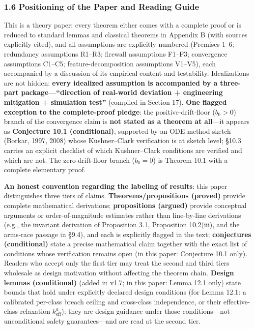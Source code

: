 \documentclass[
  11pt]{article}
\begin{document}
\subsubsection{1.6 Positioning of the Paper and Reading
Guide}\label{positioning-of-the-paper-and-reading-guide}

This is a theory paper: every theorem either comes with a complete proof
or is reduced to standard lemmas and classical theorems in Appendix B
(with sources explicitly cited), and all assumptions are explicitly
numbered (Premises 1--6; redundancy assumptions R1--R3; firewall
assumptions F1--F3; convergence assumptions C1--C5;
feature-decomposition assumptions V1--V5), each accompanied by a
discussion of its empirical content and testability. Idealizations are
not hidden: \textbf{every idealized assumption is accompanied by a
three-part package---``direction of real-world deviation + engineering
mitigation + simulation test''} (compiled in Section 17). \textbf{One
flagged exception to the complete-proof pledge}: the
positive-drift-floor (\(b_0>0\)) branch of the convergence claim is
\textbf{not stated as a theorem at all}---it appears as
\textbf{Conjecture 10.1 (conditional)}, supported by an ODE-method
sketch (Borkar, 1997, 2008) whose Kushner--Clark verification is at
sketch level; §10.3 carries an explicit checklist of which
Kushner--Clark conditions are verified and which are not. The
zero-drift-floor branch (\(b_0 = 0\)) is Theorem 10.1 with a complete
elementary proof.

\textbf{An honest convention regarding the labeling of results}: this
paper distinguishes three tiers of claims. \textbf{Theorems/propositions
(proved)} provide complete mathematical derivations;
\textbf{propositions (argued)} provide conceptual arguments or
order-of-magnitude estimates rather than line-by-line derivations (e.g.,
the invariant derivation of Proposition 3.1, Proposition 10.2(iii), and
the arms-race passage in §9.4), and each is explicitly flagged in the
text; \textbf{conjectures (conditional)} state a precise mathematical
claim together with the exact list of conditions whose verification
remains open (in this paper: Conjecture 10.1 only). Readers who accept
only the first tier may treat the second and third tiers wholesale as
design motivation without affecting the theorem chain. \textbf{Design
lemmas (conditional)} (added in v1.7; in this paper: Lemma 12.1 only)
state bounds that hold under explicitly declared design conditions (for
Lemma 12.1: a calibrated per-class breach ceiling and cross-class
independence, or their effective-class relaxation
\(k_{\mathrm{eff}}^a\)); they are design guidance under those
conditions---not unconditional safety guarantees---and are read at the
second tier.
\end{document}
